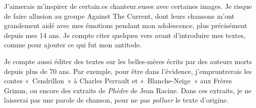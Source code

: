 \documentclass[12pt,french,letterpaper]{article}
\begin{document}
{J'aimerais m'inspirer de certain.es chanteur.euses avec certaines
images. Je risque de faire allusion au groupe Against The Current, dont
leurs chansons m'ont grandement aidé avec mes émotions pendant mon
adolescence, plus précisément depuis mes 14 ans. Je compte citer
quelques vers avant d'introduire mes textes, comme pour ajouter ce qui
fut mon antitode.

Je compte aussi éditer des textes sur les belles-mères écrits par des
auteurs morts depuis plus de 70 ans. Par exemple, pour être dans
l'évidence, j'empruntrerais les contes «~Cendrillon~» à Charles Perrault
et «~Blanche-Neige~» aux Frères Grimm, ou encore des extraits de
\emph{Phèdre} de Jean Racine. Dans ces extraits, je ne laisserai pas une
parole de chanson, pour ne pas \emph{polluer} le texte d'origine.}
\end{document}
